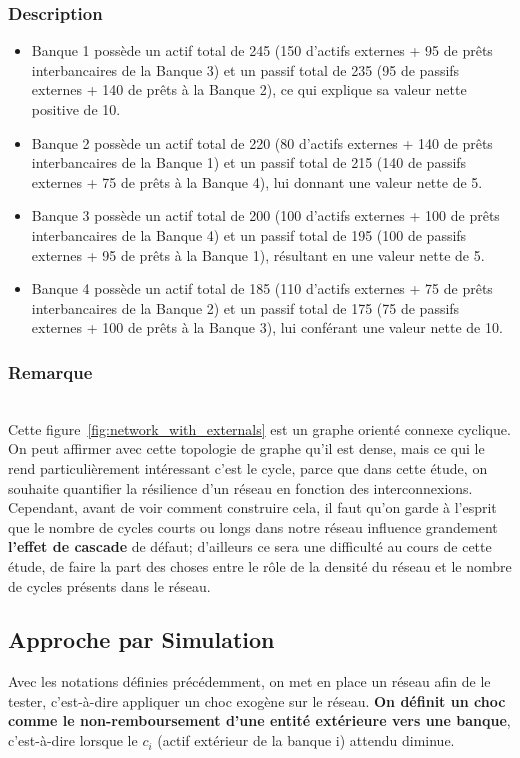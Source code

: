 \subsubsection*{Description}
\begin{itemize}
    \item Banque 1 possède un actif total de 245 (150 d'actifs externes + 95 de prêts interbancaires de la Banque 3) et un passif total de 235 (95 de passifs externes + 140 de prêts à la Banque 2), ce qui explique sa valeur nette positive de 10.
    \item Banque 2 possède un actif total de 220 (80 d'actifs externes + 140 de prêts interbancaires de la Banque 1) et un passif total de 215 (140 de passifs externes + 75 de prêts à la Banque 4), lui donnant une valeur nette de 5.
    \item Banque 3 possède un actif total de 200 (100 d'actifs externes + 100 de prêts interbancaires de la Banque 4) et un passif total de 195 (100 de passifs externes + 95 de prêts à la Banque 1), résultant en une valeur nette de 5.
    \item Banque 4 possède un actif total de 185 (110 d'actifs externes + 75 de prêts interbancaires de la Banque 2) et un passif total de 175 (75 de passifs externes + 100 de prêts à la Banque 3), lui conférant une valeur nette de 10.
\end{itemize}
\subsubsection*{Remarque}
\\
Cette figure~\ref{fig:network_with_externals} est un graphe orienté connexe cyclique.
On peut affirmer avec cette topologie de graphe qu'il est dense, mais ce qui le rend particulièrement intéressant c'est
le cycle, parce que dans cette étude, on souhaite quantifier la résilience d'un réseau en fonction des interconnexions.
Cependant, avant de voir comment construire cela, il faut qu'on garde à l'esprit que le nombre de cycles courts ou longs dans notre réseau influence grandement \textbf{l'effet de cascade}
de défaut; d'ailleurs ce sera une difficulté au cours de cette étude, de faire la part des choses entre le rôle de la densité du réseau et le nombre de cycles présents dans le réseau.

\subsection{Approche par Simulation}\label{subsec:approche-par-simulation}
Avec les notations définies précédemment,
on met en place un réseau afin de le tester, c'est-à-dire appliquer un choc exogène sur le réseau.
\textbf{On définit un choc comme le non-remboursement d'une entité extérieure vers une banque}, c'est-à-dire lorsque le $c_i$ (actif extérieur de la banque i) attendu diminue.

